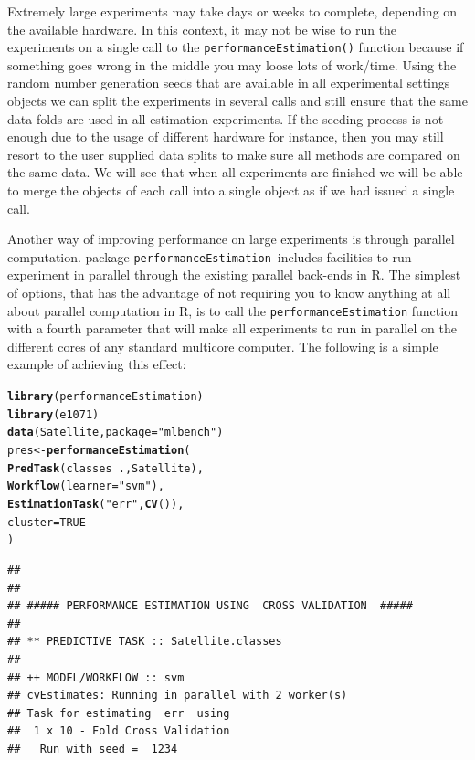 \documentclass[10pt,a4paper]{article}\usepackage[]{graphicx}\usepackage[]{color}
\makeatletter
\newcommand{\hlnum}[1]{\textcolor[rgb]{0.686,0.059,0.569}{#1}}%
\newcommand{\hlstr}[1]{\textcolor[rgb]{0.192,0.494,0.8}{#1}}%
\newcommand{\hlopt}[1]{\textcolor[rgb]{0,0,0}{#1}}%
\newcommand{\hlstd}[1]{\textcolor[rgb]{0.345,0.345,0.345}{#1}}%
\newcommand{\hlkwb}[1]{\textcolor[rgb]{0.69,0.353,0.396}{#1}}%
\newcommand{\hlkwc}[1]{\textcolor[rgb]{0.333,0.667,0.333}{#1}}%
\newcommand{\hlkwd}[1]{\textcolor[rgb]{0.737,0.353,0.396}{\textbf{#1}}}%
\newenvironment{kframe}{%
 \def\at@end@of@kframe{}%
 \ifinner\ifhmode%
  \def\at@end@of@kframe{\end{minipage}}%
  \begin{minipage}{\columnwidth}%
 \fi\fi%
 \def\FrameCommand##1{\hskip\@totalleftmargin \hskip-\fboxsep
 \colorbox{shadecolor}{##1}\hskip-\fboxsep
     \hskip-\linewidth \hskip-\@totalleftmargin \hskip\columnwidth}%
 \MakeFramed {\advance\hsize-\width
   \@totalleftmargin\z@ \linewidth\hsize
   \@setminipage}}%
 {\par\unskip\endMakeFramed%
 \at@end@of@kframe}
\newenvironment{knitrout}{}{} %
\newcommand{\PE}{package \texttt{performanceEstimation}\ }
\makeatother
\begin{document}
Extremely large experiments may take days or weeks to complete,
depending on the available hardware. In this context, it may not be
wise to run the experiments on a single call to the
\texttt{performanceEstimation()} function because if something goes
wrong in the middle you may loose lots of work/time. Using the random
number generation seeds that are available in all experimental
settings objects we can split the experiments in several calls and
still ensure that the same data folds are used in all
estimation experiments. If the seeding process is not enough due to the usage of different hardware for instance, then you may still resort to the user supplied data splits to make sure all methods are compared on the same data. We will see that when all experiments are
finished we will be able to merge the objects of each call into a
single object as if we had issued a single call. 

Another way of improving performance on large experiments is through parallel computation. \PE includes facilities to run experiment in parallel through the existing parallel back-ends in R. The simplest of options, that has the advantage of not requiring you to know anything at all about parallel computation in R, is to call the \texttt{performanceEstimation} function with a fourth parameter that will make all experiments to run in parallel on the different cores of any standard multicore computer. The following is a simple example of achieving this effect:

\begin{knitrout}\small
{}\color{fgcolor}\begin{kframe}
\begin{alltt}
\hlkwd{library}\hlstd{(performanceEstimation)}
\hlkwd{library}\hlstd{(e1071)}
\hlkwd{data}\hlstd{(Satellite,}\hlkwc{package}\hlstd{=}\hlstr{"mlbench"}\hlstd{)}
\hlstd{pres} \hlkwb{<-} \hlkwd{performanceEstimation}\hlstd{(}
    \hlkwd{PredTask}\hlstd{(classes} \hlopt{~} \hlstd{.,Satellite),}
    \hlkwd{Workflow}\hlstd{(}\hlkwc{learner}\hlstd{=}\hlstr{"svm"}\hlstd{),}
    \hlkwd{EstimationTask}\hlstd{(}\hlstr{"err"}\hlstd{,}\hlkwd{CV}\hlstd{()),}
    \hlkwc{cluster}\hlstd{=}\hlnum{TRUE}
    \hlstd{)}
\end{alltt}
\begin{verbatim}
## 
## 
## ##### PERFORMANCE ESTIMATION USING  CROSS VALIDATION  #####
## 
## ** PREDICTIVE TASK :: Satellite.classes
## 
## ++ MODEL/WORKFLOW :: svm 
## cvEstimates: Running in parallel with 2 worker(s)
## Task for estimating  err  using
##  1 x 10 - Fold Cross Validation
## 	 Run with seed =  1234
\end{verbatim}
\end{kframe}
\end{knitrout}
\end{document}
